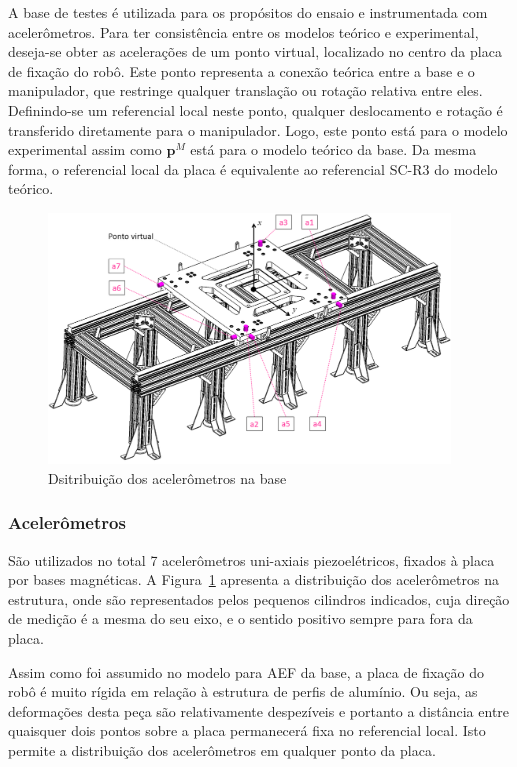 A base de testes é utilizada para os propósitos do ensaio e instrumentada com
acelerômetros. Para ter consistência entre os modelos teórico e experimental,
deseja-se obter as acelerações de um ponto virtual, localizado no centro da
placa de fixação do robô. Este ponto representa a conexão teórica entre a base e
o manipulador, que restringe qualquer translação ou rotação relativa entre eles.
Definindo-se um referencial local neste ponto, qualquer deslocamento e rotação
é transferido diretamente para o manipulador. Logo, este
ponto está para o modelo experimental assim como $\mathbf{p}^M$ está para o
modelo teórico da base. Da mesma forma, o referencial local da placa é
equivalente ao referencial SC-R3 do modelo teórico.

\begin{figure}[h]
	\centering 
 	\includegraphics[width=0.95\textwidth]{figs/acelerometos-base}
 	\caption{Dsitribuição dos acelerômetros na base}
 	\label{fig::acelerometos-base}
\end{figure}

\subsubsection{Acelerômetros}

São utilizados no total 7 acelerômetros uni-axiais piezoelétricos, fixados à
placa por bases magnéticas. A Figura~\ref{fig::acelerometos-base} apresenta a
distribuição dos acelerômetros na estrutura, onde são representados pelos
pequenos cilindros indicados, cuja direção de medição é a mesma do seu eixo, e o
sentido positivo sempre para fora da placa.

Assim como foi assumido no modelo para AEF da base, a placa de fixação do robô é
muito rígida em relação à estrutura de perfis de alumínio. Ou seja, as
deformações desta peça são relativamente despezíveis e portanto a distância
entre quaisquer dois pontos sobre a placa permanecerá fixa no referencial local.
Isto permite a distribuição dos acelerômetros em qualquer ponto da placa.

